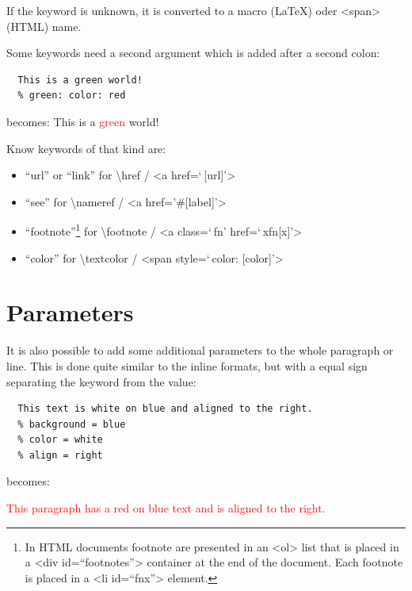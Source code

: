 \documentclass{article}
\begin{document}
{If the keyword is unknown, it is converted to a macro
(LaTeX) oder <span> (HTML) name.\\}

{Some keywords need a second argument which is added
after a second colon:\\}

\begin{verbatim}
  This is a green world!
  % green: color: red
\end{verbatim}


{becomes:
This is a \textcolor{red}{green} world!\\}

{Know keywords of that kind are:\\}

\begin{itemize}
\item “url” or “link” for \textbackslash href / <a href=‘ {[url]}’>
\item “see” for \textbackslash nameref / <a href='\#{[label]}’> 
\item “footnote”\footnote{In HTML documents footnote are presented in an <ol> list that is placed in a <div id=“footnotes”> container at the end of the document. Each footnote is placed in a <li id=“fnx”> element.}\xspace  for \textbackslash footnote / <a class=‘ fn’ href=‘ xfn{[x]}’>
\item “color” for \textbackslash textcolor / <span style=‘ color: {[color]}’>
\end{itemize}


\section{Parameters}

{It is also possible to add some additional parameters to the whole
paragraph or line. This is done quite similar to the inline
formats, but with a equal sign separating the keyword from
the value:\\}

\begin{verbatim}
  This text is white on blue and aligned to the right.
  % background = blue
  % color = white
  % align = right
\end{verbatim}


{becomes:\\}

\colorbox{PaleTurquoise1}{\parbox{\linewidth}{%
{\raggedleft%
\textcolor{red}{%
This paragraph has a red on blue text and is aligned to the
right.}\\}
}
}
\end{document}
